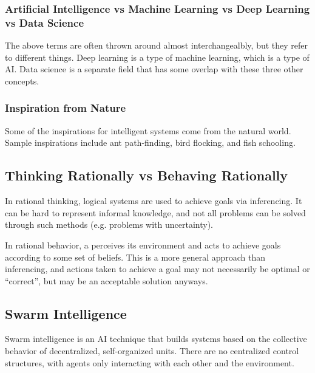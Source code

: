 \documentclass[12pt,titlepage]{article}
\begin{document}
      \subsubsection{Artificial Intelligence vs Machine Learning vs Deep Learning vs Data Science}
        The above terms are often thrown around almost interchangealbly, but they refer to different things. Deep learning is
        a type of machine learning, which is a type of AI. Data science is a separate field that has some overlap with these
        three other concepts.

      \subsubsection{Inspiration from Nature}
        Some of the inspirations for intelligent systems come from the natural world. Sample inspirations include ant path-finding,
        bird flocking, and fish schooling.

    \subsection{Thinking Rationally vs Behaving Rationally}
      In rational thinking, logical systems are used to achieve goals via inferencing. It can be hard to represent informal knowledge,
      and not all problems can be solved through such methods (e.g. problems with uncertainty).

      In rational behavior, a perceives its environment and acts to achieve goals according to some set of beliefs. This is a more
      general approach than inferencing, and actions taken to achieve a goal may not necessarily be optimal or ``correct'', but
      may be an acceptable solution anyways.
      
    \subsection{Swarm Intelligence}
      Swarm intelligence is an AI technique that builds systems based on the collective behavior of decentralized, self-organized units.
      There are no centralized control structures, with agents only interacting with each other and the environment.
\end{document}
